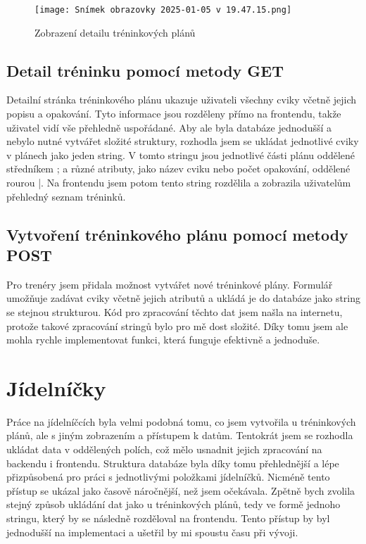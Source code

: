 \documentclass[12pt, a4paper,
twoside,        %
openany
]{report}
\begin{document}
\begin{figure}[h]
    \centering
    \texttt{[image: Snímek obrazovky 2025-01-05 v 19.47.15.png]}
    \caption{Zobrazení detailu tréninkových plánů}
\end{figure}


\subsection{Detail tréninku pomocí metody GET}
Detailní stránka tréninkového plánu ukazuje uživateli všechny cviky včetně jejich popisu a opakování. Tyto informace jsou rozděleny přímo na frontendu, takže uživatel vidí vše přehledně uspořádané. Aby ale byla databáze jednodušší a nebylo nutné vytvářet složité struktury, rozhodla jsem se ukládat jednotlivé cviky v plánech jako jeden string. V tomto stringu jsou jednotlivé části plánu oddělené středníkem ; a různé atributy, jako název cviku nebo počet opakování, oddělené rourou |. Na frontendu jsem potom tento string rozdělila a zobrazila uživatelům přehledný seznam tréninků.
\\

\subsection{Vytvoření tréninkového plánu pomocí metody POST}
Pro trenéry jsem přidala možnost vytvářet nové tréninkové plány. Formulář umožňuje zadávat cviky včetně jejich atributů a ukládá je do databáze jako string se stejnou strukturou. Kód pro zpracování těchto dat jsem našla na internetu, protože takové zpracování stringů bylo pro mě dost složité. Díky tomu jsem ale mohla rychle implementovat funkci, která funguje efektivně a jednoduše.

\section{Jídelníčky}
Práce na jídelníčcích byla velmi podobná tomu, co jsem vytvořila u tréninkových plánů, ale s jiným zobrazením a přístupem k datům. Tentokrát jsem se rozhodla ukládat data v oddělených polích, což mělo usnadnit jejich zpracování na backendu i frontendu. Struktura databáze byla díky tomu přehlednější a lépe přizpůsobená pro práci s jednotlivými položkami jídelníčků. Nicméně tento přístup se ukázal jako časově náročnější, než jsem očekávala.
\clearpage
Zpětně bych zvolila stejný způsob ukládání dat jako u tréninkových plánů, tedy ve formě jednoho stringu, který by se následně rozděloval na frontendu. Tento přístup by byl jednodušší na implementaci a ušetřil by mi spoustu času při vývoji.
\end{document}
